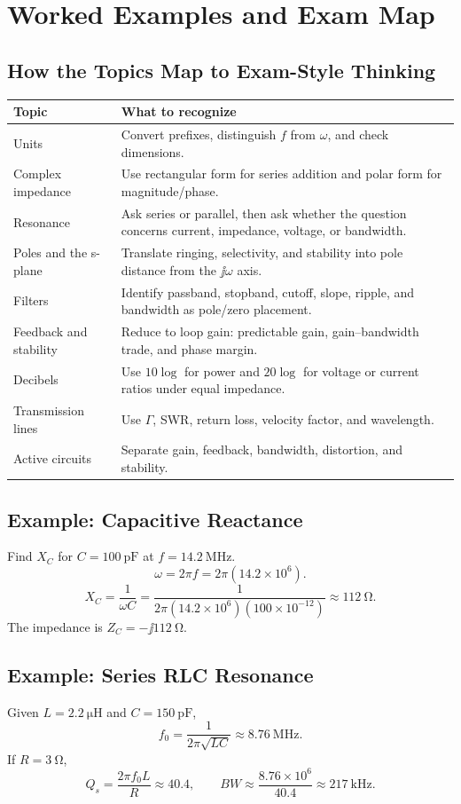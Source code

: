\chapter{Worked Examples and Exam Map}
\label{ch:exammap}
\section{How the Topics Map to Exam-Style Thinking}
\begin{tabularx}{\textwidth}{@{}L{0.24\textwidth}Y@{}}
\toprule
Topic & What to recognize \\
\midrule
Units & Convert prefixes, distinguish \(f\) from \(\omega\), and check dimensions. \\
Complex impedance & Use rectangular form for series addition and polar form for magnitude/phase. \\
Resonance & Ask series or parallel, then ask whether the question concerns current, impedance, voltage, or bandwidth. \\
Poles and the s-plane & Translate ringing, selectivity, and stability into pole distance from the \(\jj\omega\) axis. \\
Filters & Identify passband, stopband, cutoff, slope, ripple, and bandwidth as pole/zero placement. \\
Feedback and stability & Reduce to loop gain: predictable gain, gain--bandwidth trade, and phase margin. \\
Decibels & Use \(10\log\) for power and \(20\log\) for voltage or current ratios under equal impedance. \\
Transmission lines & Use \(\Gamma\), SWR, return loss, velocity factor, and wavelength. \\
Active circuits & Separate gain, feedback, bandwidth, distortion, and stability. \\
\bottomrule
\end{tabularx}

\section{Example: Capacitive Reactance}
Find \(X_C\) for \(C=\SI{100}{\pico\farad}\) at \(f=\SI{14.2}{\mega\hertz}\).
\[
\omega=2\pi f=2\pi(14.2\times10^6).
\]
\[
X_C=\frac{1}{\omega C}
=\frac{1}{2\pi(14.2\times10^6)(100\times10^{-12})}
\approx \SI{112}{\ohm}.
\]
The impedance is \(Z_C=-\jj\SI{112}{\ohm}\).

\section{Example: Series RLC Resonance}
Given \(L=\SI{2.2}{\micro\henry}\) and \(C=\SI{150}{\pico\farad}\),
\[
f_0=\frac{1}{2\pi\sqrt{LC}}
\approx \SI{8.76}{\mega\hertz}.
\]
If \(R=\SI{3}{\ohm}\),
\[
Q_s=\frac{2\pi f_0 L}{R}
\approx 40.4,
\qquad
BW\approx \frac{8.76\times10^6}{40.4}
\approx \SI{217}{\kilo\hertz}.
\]

